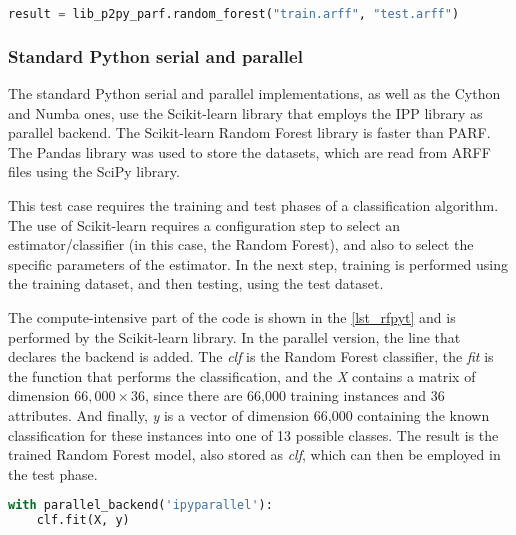 \begin{lstlisting}[float=hbt, language=Python, label={lst_rfp2p}, caption={Compute-intensive part of the Random Forest test case F2PY code.}]
result = lib_p2py_parf.random_forest("train.arff", "test.arff")
\end{lstlisting}

%
%
%
\subsubsection{Standard Python serial and parallel} %
\label{sec_rfimplpy}

The standard Python serial and parallel implementations, as well as the Cython and Numba ones, use the Scikit-learn library that employs the IPP library as parallel backend. The Scikit-learn Random Forest library is faster than PARF. The Pandas library was used to store the datasets, which are read from ARFF files using the SciPy library.

This test case requires the training and test phases of a classification algorithm. The use of Scikit-learn requires a configuration step to select an estimator/classifier (in this case, the Random Forest), and also to select the specific parameters of the estimator. In the next step, training is performed using the training dataset, and then testing, using the test dataset.

The compute-intensive part of the code is shown in the \autoref {lst_rfpyt} and is performed by the Scikit-learn library. In the parallel version, the line that declares the backend is added. The \textit {clf} is the Random Forest classifier, the \textit {fit} is the function that performs the classification, and the \textit {X} contains a matrix of dimension $66,000 \times 36$, since there are 66,000 training instances and 36 attributes. And finally, \textit {y} is a vector of dimension 66,000 containing the known classification for these instances into one of 13 possible classes. The result is the trained Random Forest model, also stored as \textit {clf}, which can then be employed in the test phase.

\begin{lstlisting}[float=hbt, language=Python, label={lst_rfpyt}, caption={Compute-intensive part of the Random Forest test case Python code.}]
with parallel_backend('ipyparallel'):
    clf.fit(X, y)
\end{lstlisting}

